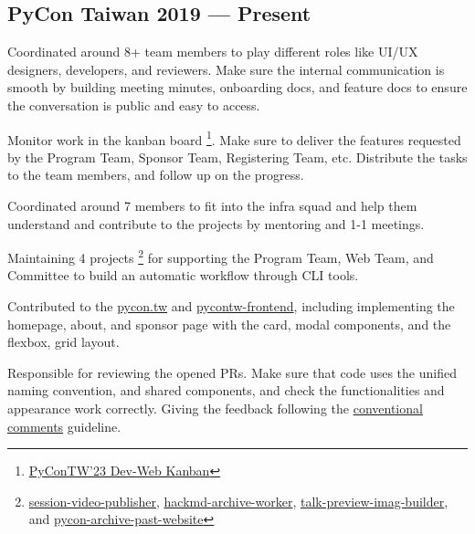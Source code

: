\subsection{{PyCon Taiwan \hfill 2019 --- Present}}
\begin{zitemize}
  \item Coordinated around 8+ team members to play different roles like UI/UX designers, developers, and reviewers. Make sure the internal communication is smooth by building meeting minutes, onboarding docs, and feature docs to ensure the conversation is public and easy to access.
  \item Monitor work in the kanban board \footnote{\href{https://github.com/orgs/pycontw/projects/2}{PyConTW'23 Dev-Web Kanban}}. Make sure to deliver the features requested by the Program Team, Sponsor Team, Registering Team, etc. Distribute the tasks to the team members, and follow up on the progress.
\end{zitemize}

\begin{zitemize}
\item Coordinated around 7 members to fit into the infra squad and help them understand and contribute to the projects by mentoring and 1-1 meetings.
\item Maintaining 4 projects \footnote{\href{https://github.com/pycontw/session-video-publisher}{session-video-publisher}, \href{https://github.com/pycontw/hackmd-archive-worker}{hackmd-archive-worker}, \href{https://github.com/pycontw/talk-preview-img-builder}{talk-preview-imag-builder}, and \href{https://github.com/pycontw/pycon_archive_past_website}{pycon-archive-past-website}} for supporting the Program Team, Web Team, and Committee to build an automatic workflow through CLI tools.
\end{zitemize}

\begin{zitemize}
\item Contributed to the \href{https://github.com/pycontw/pycon.tw}{pycon.tw} and \href{https://github.com/pycontw/pycontw-frontend}{pycontw-frontend}, including implementing the homepage, about, and sponsor page with the card, modal components, and the flexbox, grid layout.
\item Responsible for reviewing the opened PRs. Make sure that code uses the unified naming convention, and shared components, and check the functionalities and appearance work correctly. Giving the feedback following the \href{https://conventionalcomments.org/}{conventional comments} guideline.
\end{zitemize}

